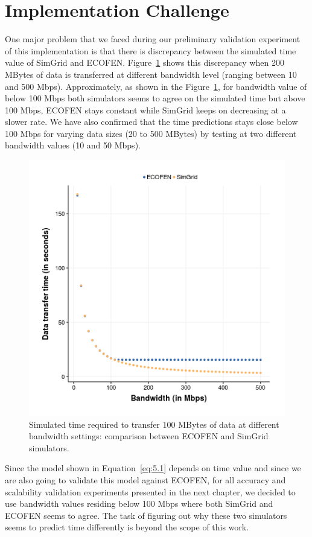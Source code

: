 \section{Implementation Challenge}
One major problem that we faced during our preliminary validation experiment of this implementation is that there is discrepancy between the simulated time value of SimGrid and ECOFEN. Figure~\ref{fig:bandwidthvstime} shows this discrepancy when 200 MBytes of data is transferred at different bandwidth level (ranging between 10 and 500 Mbps). Approximately, as shown in the Figure~\ref{fig:bandwidthvstime}, for bandwidth value of below 100 Mbps both simulators seems to agree on the simulated time but above 100 Mbps, ECOFEN stays constant while SimGrid keeps on decreasing at a slower rate. We have also confirmed that the time predictions stays close below 100 Mbps for varying data sizes (20 to 500 MBytes) by testing at two different bandwidth values (10 and 50 Mbps).

\begin{figure}[ht]
	\begin{center}
		\includegraphics[width=14cm]{images/ex18_bw_time_sg_vs_ns3}
		\caption{Simulated time required to transfer 100 MBytes of data at different bandwidth settings: comparison between ECOFEN and SimGrid simulators.}
		\label{fig:bandwidthvstime}
	\end{center}
\end{figure}

Since the model shown in Equation~\ref{eq:5.1} depends on time value and since we are also going to validate this model against ECOFEN, for all accuracy and scalability validation experiments presented in the next chapter, we decided to use bandwidth values residing below 100 Mbps where both SimGrid and ECOFEN seems to agree. The task of figuring out why these two simulators seems to predict time differently is beyond the scope of this work. 

